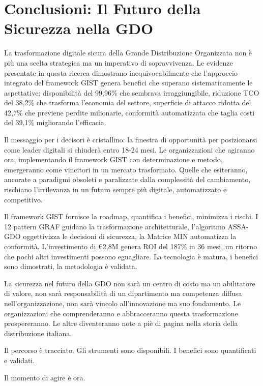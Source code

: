 \section{\texorpdfstring{Conclusioni: Il Futuro della Sicurezza nella GDO}{5.6 - Conclusioni: Il Futuro della Sicurezza nella GDO}}
\label{sec:5.6}

La trasformazione digitale sicura della Grande Distribuzione Organizzata non è più una scelta strategica ma un imperativo di sopravvivenza. Le evidenze presentate in questa ricerca dimostrano inequivocabilmente che l'approccio integrato del framework GIST genera benefici che superano sistematicamente le aspettative: disponibilità del 99,96\% che sembrava irraggiungibile, riduzione TCO del 38,2\% che trasforma l'economia del settore, superficie di attacco ridotta del 42,7\% che previene perdite milionarie, conformità automatizzata che taglia costi del 39,1\% migliorando l'efficacia.

Il messaggio per i decisori è cristallino: la finestra di opportunità per posizionarsi come leader digitali si chiuderà entro 18-24 mesi. Le organizzazioni che agiranno ora, implementando il framework GIST con determinazione e metodo, emergeranno come vincitori in un mercato trasformato. Quelle che esiteranno, ancorate a paradigmi obsoleti e paralizzate dalla complessità del cambiamento, rischiano l'irrilevanza in un futuro sempre più digitale, automatizzato e competitivo.

Il framework GIST fornisce la roadmap, quantifica i benefici, minimizza i rischi. I 12 pattern GRAF guidano la trasformazione architetturale, l'algoritmo ASSA-GDO oggettivizza le decisioni di sicurezza, la Matrice MIN automatizza la conformità. L'investimento di €2,8M genera ROI del 187\% in 36 mesi, un ritorno che pochi altri investimenti possono eguagliare. La tecnologia è matura, i benefici sono dimostrati, la metodologia è validata.

La sicurezza nel futuro della GDO non sarà un centro di costo ma un abilitatore di valore, non sarà responsabilità di un dipartimento ma competenza diffusa nell'organizzazione, non sarà vincolo all'innovazione ma suo fondamento. Le organizzazioni che comprenderanno e abbracceranno questa trasformazione prospereranno. Le altre diventeranno note a piè di pagina nella storia della distribuzione italiana.

Il percorso è tracciato. Gli strumenti sono disponibili. I benefici sono quantificati e validati.

Il momento di agire è ora.

\clearpage
\printbibliography[
    heading=subbibliography,
    title={Riferimenti Bibliografici del Capitolo 5},
]

